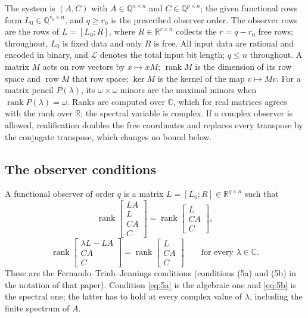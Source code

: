 The system is $(A,C)$ with $A\in\mathbb Q^{n\times n}$ and $C\in\mathbb Q^{p\times n}$;
the given functional rows form $L_0\in\mathbb Q^{r_0\times n}$, and $q\ge r_0$ is the
prescribed observer order. The observer rows are the rows of $L=[L_0;R]$, where
$R\in\mathbb R^{r\times n}$ collects the $r=q-r_0$ free rows; throughout, $L_0$ is fixed
data and only $R$ is free. All input data are rational and encoded in binary, and
$\mathcal L$ denotes the total input bit length; $q\le n$ throughout. A matrix $M$ acts on
row vectors by $x\mapsto xM$; $\operatorname{rank}M$ is the dimension of its row space and
$\operatorname{row}M$ that row space; $\ker M$ is the kernel of the map $v\mapsto Mv$. For
a matrix pencil $P(\lambda)$, its $\omega\times\omega$ minors are the maximal minors when
$\operatorname{rank}P(\lambda)=\omega$. Ranks are computed over $\mathbb C$, which for real
matrices agrees with the rank over $\mathbb R$; the spectral variable is complex. If a
complex observer is allowed, realification doubles the free coordinates and replaces every
transpose by the conjugate transpose, which changes no bound below.

\subsection{The observer conditions}\label{sec:conditions}

A functional observer of order $q$ is a matrix $L=[L_0;R]\in\mathbb R^{q\times n}$ such
that
\begin{equation}\label{eq:5a}
\operatorname{rank}\begin{bmatrix}LA\\ L\\ CA\\ C\end{bmatrix}
=\operatorname{rank}\begin{bmatrix}L\\ CA\\ C\end{bmatrix},
\end{equation}
\begin{equation}\label{eq:5b}
\operatorname{rank}\begin{bmatrix}\lambda L-LA\\ CA\\ C\end{bmatrix}
=\operatorname{rank}\begin{bmatrix}L\\ CA\\ C\end{bmatrix}
\qquad\text{for every }\lambda\in\mathbb C.
\end{equation}
These are the Fernando--Trinh--Jennings conditions \cite{fer10} (conditions (5a) and (5b)
in the notation of that paper). Condition \eqref{eq:5a} is the algebraic one and
\eqref{eq:5b} is the spectral one; the latter has to hold at every complex value of
$\lambda$, including the finite spectrum of $A$.

